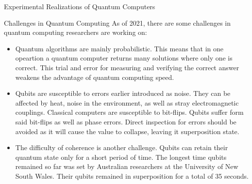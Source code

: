 \documentclass[aps,twocolumn,preprintnumbers]{revtex4}
\begin{document}
\begin{section}{Experimental Realizations of Quantum Computers}
\begin{section}{Challenges in Quantum Computing}
As of 2021, there are some challenges in quantum computing researchers are working on: 

\begin{itemize}
    \item Quantum algorithms are mainly probabilistic. 
    This means that in one opeartion a quantum computer returns many solutions where only one is correct. 
    This trial and error for measuring and verifying the correct answer weakens the advantage of quantum computing speed. 
    \item Qubits are susceptible to errors earlier introduced as noise. 
    They can be affected by heat, noise in the environment, 
    as well as stray electromagnetic couplings. 
    Classical computers are susceptible to bit-flips. Qubits suffer form said bit-flips as well as phase errors. 
    Direct inspection for errors should be avoided as it will cause the value to collapse, leaving it superposition state.
    \item The difficulty of coherence is another challenge. 
    Qubits can retain their quantum state only for a short period of time. 
    The longest time qubits remained so far was set by Australian researchers at the University of New South Wales. 
    Their qubits remained in superposition for a total of 35 seconds.
\end{itemize}

\end{section}

\end{section}
\end{document}
